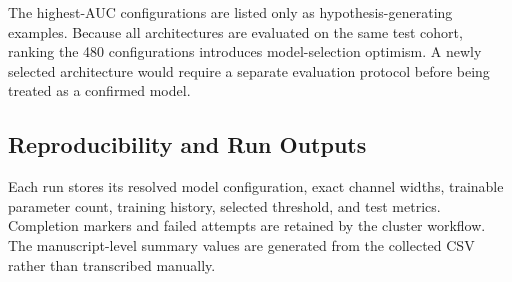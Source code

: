 The highest-AUC configurations are listed only as hypothesis-generating examples. Because all architectures are evaluated on the same test cohort, ranking the 480 configurations introduces model-selection optimism. A newly selected architecture would require a separate evaluation protocol before being treated as a confirmed model.

\subsection{Reproducibility and Run Outputs}
Each run stores its resolved model configuration, exact channel widths, trainable parameter count, training history, selected threshold, and test metrics. Completion markers and failed attempts are retained by the cluster workflow. The manuscript-level summary values are generated from the collected CSV rather than transcribed manually.
